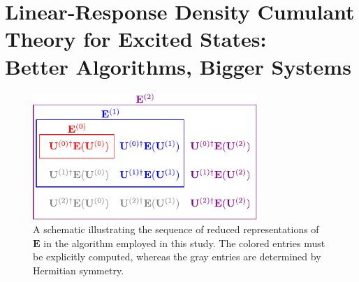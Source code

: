 \chapter[%
    Linear-Response Density Cumulant Theory for Excited States:\\
	Better Algorithms, Bigger Systems
]{%
    Linear-Response Density Cumulant Theory for Excited States:\\
	Better Algorithms, Bigger Systems
}
\label{ch:davidson}


\begin{figure}[h!]
    \centering
    \caption{%
        \label{fig:davidson}
        A schematic illustrating the sequence of reduced representations of
        \(\mathbf{E}\) in the algorithm employed in this study.
        The colored entries must be explicitly computed, whereas the gray
        entries are determined by Hermitian symmetry.
    }
    \includegraphics[width=8.5cm]{figures/davidson.pdf}
\end{figure}

